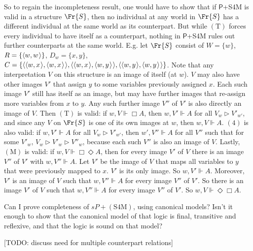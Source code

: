 \documentclass[11pt]{woarticle}
\theoremstyle{break}
\theoremstyle{nonumberplain}
\newcommand{\s}[1]{\ensuremath{\mathsf{#1}}}
\newcommand{\SAT}{\Vdash}
\newcommand{\Img}{\triangleright}
\newcommand{\1}{\;\,|\;\,}
\renewcommand{\t}[1]{\ensuremath{\langle #1  \makebox[.2ex]{}\rangle}}
\newcommand{\T}[1]{\ensuremath{(\mathrm{ #1})}}
\begin{document}
{So to regain the incompleteness result, one would have to show that if
\s{P}+S4M is valid in a structure $\Fr{S}$, then no individual at any
world in $\Fr{S}$ has a different individual at the same world as its
counterpart. But while \T{T} forces every individual to have itself as
a counterpart, nothing in \s{P}+S4M rules out further counterparts at
the same world. E.g. let $\Fr{S}$ consist of $W=\{w\}$, $R =
\{\t{w,w}\}$, $D_w = \{x,y\}$, $C = \{ \t{\t{w,x},\t{w,x}},
\t{\t{w,x},\t{w,y}}, \t{\t{w,y},\t{w,y}} \}$. Note that any
interpretation $V$ on this structure is an image of itself (at
$w$). $V$ may also have other images $V'$ that assign $y$ to some
variables previously assigned $x$. Each such image $V'$ still has
itself as an image, but may have further images that re-assign more
variables from $x$ to $y$. Any such further image $V''$ of $V'$ is
also directly an image of $V$.  Then \T{T} is valid: if $w,V \SAT \Box
A$, then $w,V' \SAT A$ for all $V_w \Img V'_{w'}$, and since any $V$
on $\Fr{S}$ is one of its own images at $w$, then $w,V \SAT A$. \T{4}
is also valid: if $w,V' \SAT A$ for all $V_w\Img V'_{w'}$, then
$w',V'' \SAT A$ for all $V''$ such that for some $V'_w$, $V_w \Img
V'_w \Img V''_w$, because each such $V''$ is also an image of
$V$. Lastly, \T{M} is valid: if $w,V \SAT \Box\Diamond A$, then for
every image $V'$ of $V$ there is an image $V''$ of $V'$ with $w,V''
\SAT A$. Let $V'$ be the image of $V$ that maps all variables to $y$
that were previously mapped to $x$. $V'$ is its only image. So $w,V'
\SAT A$. Moreover, $V'$ is an image of $V$ such that $w,V'' \SAT A$
for every image $V''$ of $V'$. So there is an image $V'$ of $V$ such
that $w,V'' \SAT A$ for every image $V''$ of $V'$. So $w,V \SAT
\Diamond \Box A$.

Can I prove completeness of $s{P}+\T{S4M}$, using canonical models?
Isn't it enough to show that the canonical model of that logic is
final, transitive and reflexive, and that the logic is sound on that
model? 

}%

[TODO: discuss need for multiple counterpart relations]
\end{document}
